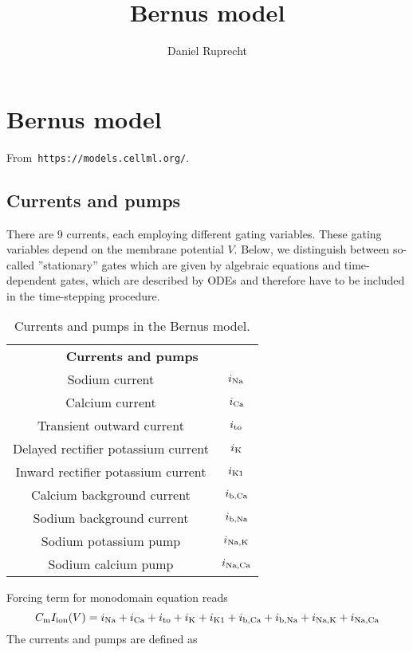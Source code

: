 \documentclass{scrartcl}
\def\sodcurr {$i_{\rm Na}$}
\def\calcurr {$i_{\rm Ca}$}
\def\tocurr {$i_{\rm to}$}
\def\potcurr {$i_{\rm K}$}
\def\pincurr {$i_{\rm K1}$}
\def\cabacurr { $i_{\rm b, Ca}$ }
\def\nabacurr { $i_{\rm b, Na}$ }
\def\napopump { $i_{\rm Na, K}$ }
\def\nacapump{ $i_{\rm Na, Ca}$ }
\begin{document}
\title{Bernus model}
\author{Daniel Ruprecht}

\maketitle

\section{Bernus model}
From~\texttt{https://models.cellml.org/}. 

\subsection{Currents and pumps}
There are 9 currents, each employing different gating variables. 
These gating variables depend on the membrane potential $V$.
Below, we distinguish between so-called ''stationary'' gates which are given by algebraic equations and time-dependent gates, which are described by ODEs and therefore have to be included in the time-stepping procedure.
\begin{table}[th]
\centering
\begin{tabular}{cc}
\multicolumn{2}{c}{\bf Currents and pumps}\\
Sodium current & \sodcurr \\
Calcium current & \calcurr \\
Transient outward current & \tocurr \\
Delayed rectifier potassium current & \potcurr \\
Inward rectifier potassium current & \pincurr \\
Calcium background current & \cabacurr \\
Sodium background current & \nabacurr \\
Sodium potassium pump & \napopump \\
Sodium calcium pump & \nacapump
\end{tabular}
%
\caption{Currents and pumps in the Bernus model.}
\end{table}
Forcing term for monodomain equation reads
\begin{equation}
	C_{\rm m} I_{\rm ion}(V) = i_{\rm Na} + i_{\rm Ca} + i_{\rm to} + i_{\rm K} + i_{\rm K1} +  i_{\rm b, Ca} + i_{\rm b, Na}  + i_{\rm Na, K} + i_{\rm Na, Ca}
\end{equation}
The currents and pumps are defined as
\end{document}
